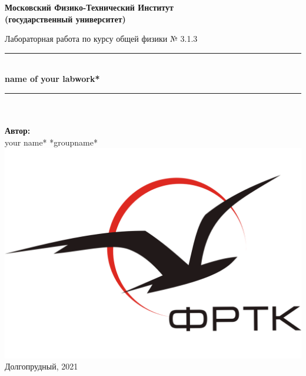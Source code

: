 \newcommand{\HRule}{\rule{\linewidth}{0.7mm}} %
	
	\begin{center}
		\large\textbf{Московский Физико-Технический Институт}\\ %
		\large\textbf{(государственный университет)}
	
		\vfill
		
		\Large Лабораторная работа по курсу общей физики № 3.1.3\\[0.5cm] %
		
		
		\HRule
		\\[0.4cm]
		{ \huge \bfseries *name of your labwork*}%
		\\[0.4cm] 
		\HRule
		\\[0.5cm]
		
		\ \\
	\textbf{\large Автор:} \\	
	\large *your name* *groupname*\\ %
		\vfill
		\hspace*{-0.8 cm}\includegraphics[width=100 pt]{../images/frkt_logo}\\ %
		\large Долгопрудный, 2021 %
	\end{center}

\newpage
\setcounter{page}{2}
\fancyfoot[c]{\thepage}
\fancyhead[R]{}
